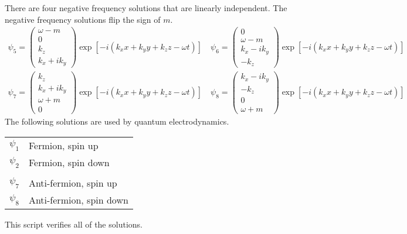 \documentclass[12pt]{article}
\begin{document}
%
%
There are four negative frequency solutions that are linearly independent.
The negative frequency solutions flip the sign of $m$.
\begin{gather*}
\psi_5=\begin{pmatrix}\omega-m\\0\\k_z\\k_x+ik_y\end{pmatrix}
\exp[-i(k_xx+k_yy+k_zz-\omega t)]
\quad
\psi_6=\begin{pmatrix}0\\ \omega-m\\k_x-ik_y\\-k_z\end{pmatrix}
\exp[-i(k_xx+k_yy+k_zz-\omega t)]
\\
\psi_7=\begin{pmatrix}k_z\\k_x+ik_y\\ \omega+m\\0\end{pmatrix}
\exp[-i(k_xx+k_yy+k_zz-\omega t)]
\quad
\psi_8=\begin{pmatrix}k_x-ik_y\\-k_z\\0\\ \omega+m\end{pmatrix}
\exp[-i(k_xx+k_yy+k_zz-\omega t)]
\end{gather*}
The following solutions are used by quantum electrodynamics.

\begin{center}
\begin{tabular}{ll}
$\psi_1$ & Fermion, spin up\\
$\psi_2$ & Fermion, spin down\\
\\
$\psi_7$ & Anti-fermion, spin up\\
$\psi_8$ & Anti-fermion, spin down
\end{tabular}
\end{center}

\noindent
This script verifies all of the solutions.
%
\end{document}
